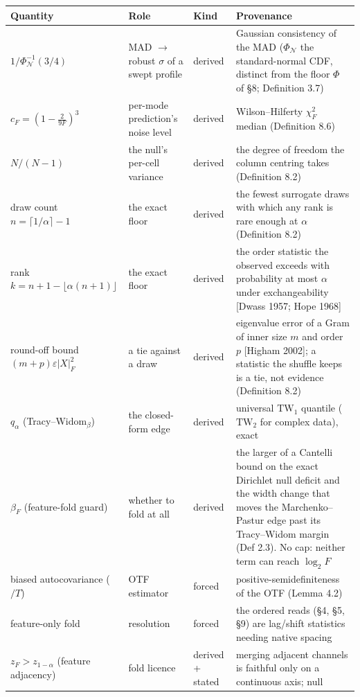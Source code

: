 \documentclass[10pt,letterpaper,twocolumn]{article}
\begin{document}
\begin{table}[tp]
\centering\footnotesize
\begin{tabular}{L{0.239\textwidth}L{0.108\textwidth}L{0.173\textwidth}L{0.413\textwidth}}
\toprule
Quantity & Role & Kind & Provenance \\
\midrule
\(1/\Phi_{\mathcal N}^{-1}(3/4)\) & MAD \(\to\) robust \(\sigma\) of a swept profile & derived & Gaussian consistency of the MAD (\(\Phi_{\mathcal N}\) the
standard-normal CDF, distinct from the floor \(\Phi\) of §8; Definition
3.7) \\
\(c_F=(1-\tfrac{2}{9F})^3\) & per-mode prediction's noise level & derived & Wilson--Hilferty \(\chi^2_F\) median (Definition 8.6) \\
\(N/(N-1)\) & the null's per-cell variance & derived & the degree of freedom the column centring takes (Definition 8.2) \\
draw count \(n=\lceil1/\alpha\rceil-1\) & the exact floor & derived & the fewest surrogate draws with which any rank is rare enough at
\(\alpha\) (Definition 8.2) \\
rank \(k=n+1-\lfloor\alpha(n+1)\rfloor\) & the exact floor & derived & the order statistic the observed exceeds with probability at most
\(\alpha\) under exchangeability {[}Dwass 1957; Hope 1968{]} \\
round-off bound \((m+p)\varepsilon|X|_F^2\) & a tie against a draw & derived & eigenvalue error of a Gram of inner size \(m\) and order \(p\) {[}Higham
2002{]}; a statistic the shuffle keeps is a tie, not evidence
(Definition 8.2) \\
\(q_\alpha\) (Tracy--Widom\(_\beta\)) & the closed-form edge & derived & universal \(\mathrm{TW}_1\) quantile (\(\mathrm{TW}_2\) for complex
data), exact \\
\(\beta_F\) (feature-fold guard) & whether to fold at all & derived & the larger of a Cantelli bound on the exact Dirichlet null deficit and
the width change that moves the Marchenko--Pastur edge past its
Tracy--Widom margin (Def 2.3). No cap: neither term can reach
\(\log_2F\) \\
biased autocovariance (\(/T\)) & OTF estimator & forced & positive\allowbreak{}-\allowbreak{}semidefi\allowbreak{}niteness of the
OTF (Lemma 4.2) \\
feature-only fold & resolution & forced & the ordered reads (§4, §5, §9) are lag/shift statistics needing native
spacing \\
\(z_F>z_{1-\alpha}\) (feature adjacency) & fold licence & derived + stated & merging adjacent channels is faithful only on a continuous axis; null

\end{tabular}
\end{table}
\end{document}

